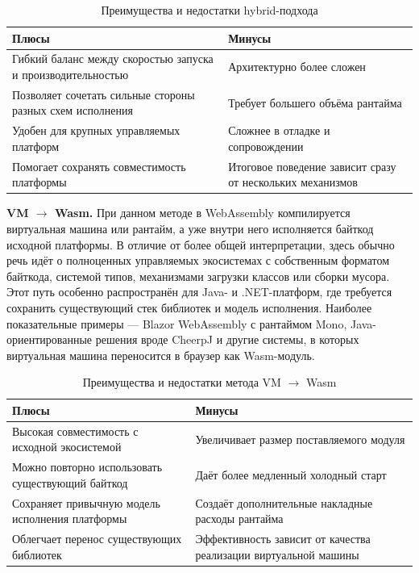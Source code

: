 \begin{table}[htbp]
\centering
\scriptsize
\renewcommand{\arraystretch}{1.15}
\begin{tabular}{|p{5.8cm}|p{5.8cm}|}
\hline
\textbf{Плюсы} & \textbf{Минусы} \\
\hline
Гибкий баланс между скоростью запуска и производительностью & Архитектурно более сложен \\
\hline
Позволяет сочетать сильные стороны разных схем исполнения & Требует большего объёма рантайма \\
\hline
Удобен для крупных управляемых платформ & Сложнее в отладке и сопровождении \\
\hline
Помогает сохранять совместимость платформы & Итоговое поведение зависит сразу от нескольких механизмов \\
\hline
\end{tabular}
\caption{Преимущества и недостатки hybrid-подхода}
\label{tab:hybrid_pros_cons}
\end{table}

    \quad \textbf{VM $\rightarrow$ Wasm.} При данном методе в WebAssembly компилируется виртуальная машина или рантайм, а уже внутри него исполняется байткод исходной платформы. В отличие от более общей интерпретации, здесь обычно речь идёт о полноценных управляемых экосистемах с собственным форматом байткода, системой типов, механизмами загрузки классов или сборки мусора. Этот путь особенно распространён для Java- и .NET-платформ, где требуется сохранить существующий стек библиотек и модель исполнения. Наиболее показательные примеры --- Blazor WebAssembly с рантаймом Mono, Java-ориентированные решения вроде CheerpJ и другие системы, в которых виртуальная машина переносится в браузер как Wasm-модуль.

\begin{table}[htbp]
\centering
\scriptsize
\renewcommand{\arraystretch}{1.15}
\begin{tabular}{|p{5.8cm}|p{5.8cm}|}
\hline
\textbf{Плюсы} & \textbf{Минусы} \\
\hline
Высокая совместимость с исходной экосистемой & Увеличивает размер поставляемого модуля \\
\hline
Можно повторно использовать существующий байткод & Даёт более медленный холодный старт \\
\hline
Сохраняет привычную модель исполнения платформы & Создаёт дополнительные накладные расходы рантайма \\
\hline
Облегчает перенос существующих библиотек & Эффективность зависит от качества реализации виртуальной машины \\
\hline
\end{tabular}
\caption{Преимущества и недостатки метода VM $\rightarrow$ Wasm}
\label{tab:vm_to_wasm_pros_cons}
\end{table}

